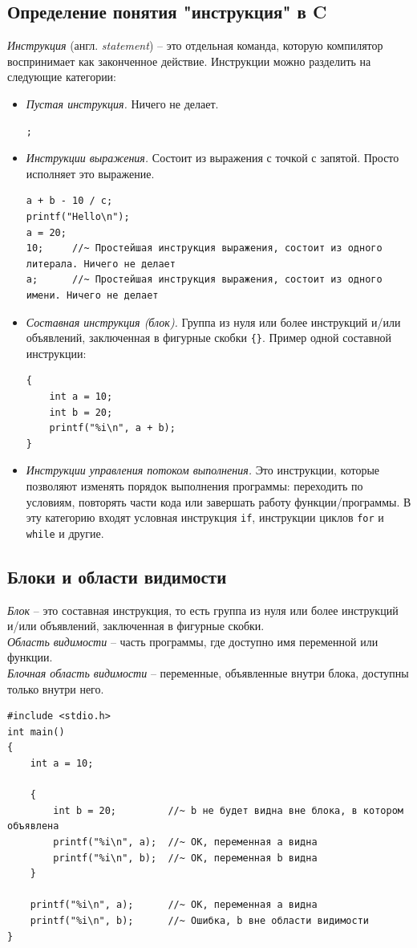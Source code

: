 \documentclass{article}
\begin{document}
\subsection*{Определение понятия "инструкция"{} в C}
\textit{Инструкция} (англ. \textit{statement}) -- это отдельная команда, которую компилятор воспринимает как законченное действие. Инструкции можно разделить на следующие категории:
\begin{itemize}
\item \textit{Пустая инструкция.} Ничего не делает.
\begin{lstlisting}
;
\end{lstlisting}

\item \textit{Инструкции выражения.} Состоит из выражения с точкой с запятой. Просто исполняет это выражение.
\begin{lstlisting}
a + b - 10 / c;
printf("Hello\n");
a = 20;
10;		//~ Простейшая инструкция выражения, состоит из одного литерала. Ничего не делает
a;		//~ Простейшая инструкция выражения, состоит из одного имени. Ничего не делает
\end{lstlisting}

\item \textit{Составная инструкция (блок).} Группа из нуля или более инструкций и/или объявлений, заключенная в фигурные скобки \texttt{\{\}}.
Пример одной составной инструкции:
\begin{lstlisting}
{
	int a = 10;
	int b = 20;
	printf("%i\n", a + b);
}
\end{lstlisting}

\item \textit{Инструкции управления потоком выполнения.} Это инструкции, которые позволяют изменять порядок выполнения программы: переходить по условиям, повторять части кода или завершать работу функции/программы. В эту категорию входят условная инструкция \texttt{if}, инструкции циклов \texttt{for} и \texttt{while} и другие.
\end{itemize}


\subsection*{Блоки и области видимости}
\textit{Блок} -- это составная инструкция, то есть группа из нуля или более инструкций и/или объявлений, заключенная в фигурные скобки.\\
\textit{Область видимости} -- часть программы, где доступно имя переменной или функции.\\
\textit{Блочная область видимости} -- переменные, объявленные внутри блока, доступны только внутри него.
\begin{lstlisting}
#include <stdio.h>
int main() 
{
    int a = 10;
    
    {
        int b = 20;			//~ b не будет видна вне блока, в котором объявлена
        printf("%i\n", a);  //~ ОК, переменная a видна
        printf("%i\n", b);  //~ ОК, переменная b видна
    }

    printf("%i\n", a);  	//~ ОК, переменная a видна
    printf("%i\n", b);  	//~ Ошибка, b вне области видимости
}
\end{lstlisting}
\end{document}
